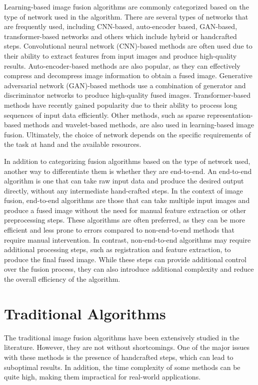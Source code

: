 Learning-based image fusion algorithms are commonly categorized based on the type of network used in the algorithm. There are several types of networks that are frequently used, including CNN-based, auto-encoder based, GAN-based, transformer-based networks and others which include hybrid or handcrafted steps. Convolutional neural network (CNN)-based methods are often used due to their ability to extract features from input images and produce high-quality results. Auto-encoder-based methods are also popular, as they can effectively compress and decompress image information to obtain a fused image. Generative adversarial network (GAN)-based methods use a combination of generator and discriminator networks to produce high-quality fused images. Transformer-based methods have recently gained popularity due to their ability to process long sequences of input data efficiently. Other methods, such as sparse representation-based methods and wavelet-based methods, are also used in learning-based image fusion. Ultimately, the choice of network depends on the specific requirements of the task at hand and the available resources.

In addition to categorizing fusion algorithms based on the type of network used, another way to differentiate them is whether they are end-to-end. An end-to-end algorithm is one that can take raw input data and produce the desired output directly, without any intermediate hand-crafted steps. In the context of image fusion, end-to-end algorithms are those that can take multiple input images and produce a fused image without the need for manual feature extraction or other preprocessing steps. These algorithms are often preferred, as they can be more efficient and less prone to errors compared to non-end-to-end methods that require manual intervention. In contrast, non-end-to-end algorithms may require additional processing steps, such as registration and feature extraction, to produce the final fused image. While these steps can provide additional control over the fusion process, they can also introduce additional complexity and reduce the overall efficiency of the algorithm.

\section{Traditional Algorithms}

The traditional image fusion algorithms have been extensively studied in the literature. However, they are not without shortcomings. One of the major issues with these methods is the presence of handcrafted steps, which can lead to suboptimal results. In addition, the time complexity of some methods can be quite high, making them impractical for real-world applications.

